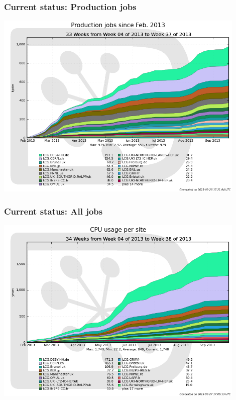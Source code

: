 \documentclass[10pt,table,dvipsnames]{beamer}
\begin{document}
\begin{frame} 
\frametitle{Current status: Production jobs}
\centering
\includegraphics[width=0.9\textwidth]{prodjobs}
\end{frame}

\begin{frame} 
\frametitle{Current status: All jobs}
\centering
\includegraphics[width=0.9\textwidth]{CPUPerSite}
\end{frame} 
\end{document}
